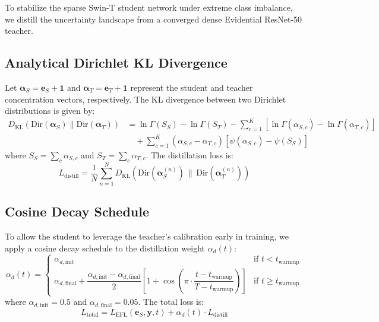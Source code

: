 \documentclass[11pt]{article}
\newcommand{\Dir}{\text{Dir}}
\newcommand{\KL}{D_{\text{KL}}}
\begin{document}
To stabilize the sparse Swin-T student network under extreme class imbalance, we distill the uncertainty landscape from a converged dense Evidential ResNet-50 teacher.

\subsection{Analytical Dirichlet KL Divergence}\label{subsec:dir_kl}

Let $\bm{\alpha}_S = \bm{e}_S + \bm{1}$ and $\bm{\alpha}_T = \bm{e}_T + \bm{1}$ represent the student and teacher concentration vectors, respectively. The KL divergence between two Dirichlet distributions is given by:
\begin{align}
    \KL(\Dir(\bm{\alpha}_S) \| \Dir(\bm{\alpha}_T)) &= \ln \Gamma(S_S) - \ln \Gamma(S_T) - \sum_{c=1}^K \left[\ln \Gamma(\alpha_{S,c}) - \ln \Gamma(\alpha_{T,c})\right] \nonumber \\
    &\quad + \sum_{c=1}^K (\alpha_{S,c} - \alpha_{T,c})\left[\psi(\alpha_{S,c}) - \psi(S_S)\right] \label{eq:dir_kl_full}
\end{align}
where $S_S = \sum_c \alpha_{S,c}$ and $S_T = \sum_c \alpha_{T,c}$. The distillation loss is:
\begin{equation}\label{eq:distill_loss}
    L_{\text{distill}} = \frac{1}{N}\sum_{n=1}^N \KL\!\left(\Dir(\bm{\alpha}_{S}^{(n)}) \,\|\, \Dir(\bm{\alpha}_{T}^{(n)})\right)
\end{equation}

\subsection{Cosine Decay Schedule}\label{subsec:cosine_decay}

To allow the student to leverage the teacher's calibration early in training, we apply a cosine decay schedule to the distillation weight $\alpha_d(t)$:
\begin{equation}\label{eq:alpha_d}
    \alpha_d(t) = \begin{cases}
        \alpha_{d,\text{init}} & \text{if } t < t_{\text{warmup}} \\[6pt]
        \alpha_{d,\text{final}} + \dfrac{\alpha_{d,\text{init}} - \alpha_{d,\text{final}}}{2}\left[1 + \cos\!\left(\pi \cdot \dfrac{t - t_{\text{warmup}}}{T - t_{\text{warmup}}}\right)\right] & \text{if } t \ge t_{\text{warmup}}
    \end{cases}
\end{equation}
where $\alpha_{d,\text{init}} = 0.5$ and $\alpha_{d,\text{final}} = 0.05$. The total loss is:
\begin{equation}\label{eq:total_loss}
    \boxed{L_{\text{total}} = L_{\text{EFL}}(\bm{e}_S, \bm{y}, t) + \alpha_d(t) \cdot L_{\text{distill}}}
\end{equation}
\end{document}
